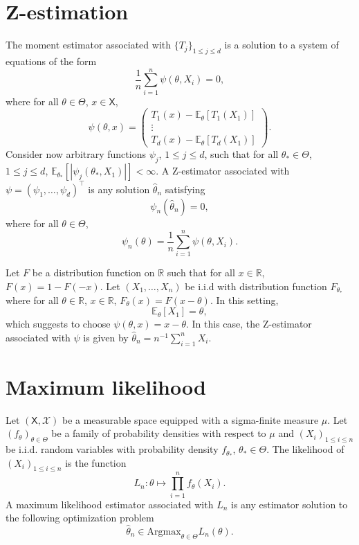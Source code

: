 \documentclass[english,graybox,envcountchap,envcountsame,sectrefs,shortlabels]{svmono}
\theoremstyle{style}
\newcommand{\eqsp}{}
\newcommand{\Xset}{\mathsf{X}}
\newcommand{\Xsigma}{\mathcal{X}}
\begin{document}
\section{Z-estimation}
The moment estimator associated with $\{T_j\}_{1\leq j\leq d}$ is a solution to a system of equations of the form
$$
\frac{1}{n}\sum_{i=1}^n\psi(\theta,X_i) = 0\eqsp,
$$
where for all $\theta\in\Theta$, $x\in\Xset$,
$$
\psi(\theta,x)  =\begin{pmatrix}T_1(x) - \mathbb{E}_{\theta}[T_1(X_1)]\\ \vdots \\T_d(x) - \mathbb{E}_{\theta}[T_d(X_1)]\end{pmatrix}\eqsp.
$$
Consider now arbitrary functions $\psi_j$, $1\leq j\leq d$, such that for all $\theta_*\in\Theta$, $1\leq j \leq d$, $\mathbb{E}_{\theta_*}[|\psi_j(\theta_*,X_1)|]<\infty$. A Z-estimator associated with $\psi = (\psi_1,\ldots,\psi_d)^\top$ is any solution $\widehat\theta_n$ satisfying
$$
\psi_n(\widehat\theta_n) = 0\eqsp,
$$
where for all $\theta\in\Theta$,
$$
\psi_n(\theta) = \frac{1}{n}\sum_{i=1}^n\psi(\theta,X_i)\eqsp.
$$
\begin{example}
Let $F$ be a distribution function on $\mathbb{R}$ such that for all $x\in\mathbb{R}$, $F(x) = 1 - F(-x)$. Let $(X_1,\ldots,X_n)$ be i.i.d with distribution function $F_{\theta_*}$ where for all $\theta\in\mathbb{R}$, $x\in\mathbb{R}$, $F_\theta(x) = F(x-\theta)$. In this setting,
$$
\mathbb{E}_\theta[X_1] = \theta\eqsp,
$$
which suggests to choose $\psi(\theta,x) = x-\theta$. In this case, the Z-estimator associated with $\psi$ is given by $\widehat\theta_n = n^{-1}\sum_{i=1}^nX_i$.
\end{example}


\section{Maximum likelihood}
\begin{definition}
Let $(\Xset,\Xsigma)$ be a measurable space equipped with a sigma-finite measure $\mu$. Let $(f_\theta)_{\theta\in\Theta}$ be a family of probability densities with respect to $\mu$ and $(X_i)_{1\leq i\leq n}$ be i.i.d. random variables with probability density $f_{\theta_*}$, $\theta_*\in\Theta$. The likelihood of $(X_i)_{1\leq i\leq n}$ is the function
$$
L_n:\theta\mapsto \prod_{i=1}^nf_\theta(X_i)\eqsp.
$$
A maximum likelihood estimator associated with $L_n$ is any estimator solution to the following optimization problem
$$
\widehat\theta_n\in \mathrm{Argmax}_{\theta\in\Theta} L_n(\theta)\eqsp.
$$
\end{definition}
\end{document}

